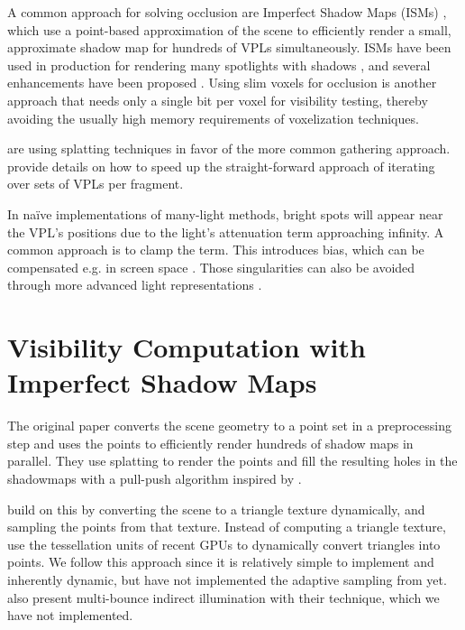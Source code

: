 A common approach for solving occlusion are Imperfect Sha\-dow Maps (ISMs) \cite{ritschel2008ism}, which use a point-based approximation of the scene to efficiently render a small, approximate shadow map for hundreds of VPLs simultaneously. ISMs have been used in production for rendering many spotlights with shadows \cite{evans2015dreams}, and several enhancements have been proposed \cite{ritschel2011ismsViewAdaptive, hollander2011manylods, barak2013temporally}. Using slim voxels \cite{sugihara2014layered, sun2015manylightsSVO, chen2016quantizing} for occlusion is another approach that needs only a single bit per voxel for visibility testing, thereby avoiding the usually high memory requirements of voxelization techniques.

\cite{dachsbacher2006splatting, Nichols:2009:splatting} are using splatting techniques in favor of the more common gathering approach. \cite{sloan2007image, laine2007incremental} provide details on how to speed up the straight-forward approach of iterating over sets of VPLs per fragment.

In na\"ive implementations of many-light methods, bright spots will appear near the VPL's positions due to the light's attenuation term approaching infinity. A common approach is to clamp the term. This introduces bias, which can be compensated e.g. in screen space \cite{novak2011screen}. Those singularities can also be avoided through more advanced light representations \cite{tokuyoshi2015vsgl}. \cite{olsson2012clustered}



\section{Visibility Computation with Imperfect Shadow Maps}
\label{sec:concept:ism}

The original paper \cite{ritschel2008ism} converts the scene geometry to a point set in a preprocessing step and uses the points to efficiently render hundreds of shadow maps in parallel. They use splatting to render the points and fill the resulting holes in the shadowmaps with a pull-push algorithm inspired by \cite{Marroquim:2007:reconstruction}.

\cite{ritschel2011ismsViewAdaptive} build on this by converting the scene to a triangle texture dynamically, and sampling the points from that texture. Instead of computing a triangle texture, \cite{barak2013temporally} use the tessellation units of recent GPUs to dynamically convert triangles into points.
We follow this approach since it is relatively simple to implement and inherently dynamic, but have not implemented the adaptive sampling from \cite{ritschel2011ismsViewAdaptive} yet.
\cite{ritschel2008ism} also present multi-bounce indirect illumination with their technique, which we have not implemented.

